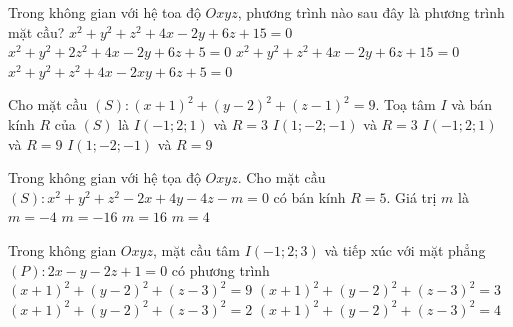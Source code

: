 \begin{ex}%
	Trong không gian với hệ toa độ $Oxyz$, phương trình nào sau đây là phương trình mặt cầu?
	\choice
	{$x^{2}+y^{2}+z^{2}+4 x-2 y+6 z+15=0$}
	{$x^{2}+y^{2}+2 z^{2}+4 x-2 y+6 z+5=0$}
	{\True $x^{2}+y^{2}+z^{2}+4 x-2 y+6 z+15=0$}
	{$x^{2}+y^{2}+z^{2}+4 x-2 x y+6 z+5=0$}
\end{ex}
\begin{ex}%
	Cho mặt cầu $(S)\colon (x+1)^2+(y-2)^2+(z-1)^2=9$. 
	Toạ tâm $I$ và bán kính $R$ của $(S)$ là
	\choice
	{\True $I(-1 ; 2 ; 1)$ và $R=3$}
	{$I(1 ;-2 ;-1)$ và $R=3$}
	{$I(-1 ; 2 ; 1)$ và $R=9$}
	{$I(1 ;-2 ;-1)$ và $R=9$}
\end{ex}
\begin{ex}%
	Trong không gian với hệ tọa độ $Oxyz$. Cho mặt cầu
	$(S)\colon x^{2}+y^{2}+z^{2}-2x+4y-4z-m=0$ có bán kính $R=5$. Giá trị $m$ là
	\choice
	{$m=-4$}
	{$m=-16$}
	{\True $m=16$}
	{$m=4$}
\end{ex}
\begin{ex}%
	Trong không gian $ Oxyz $, mặt cầu  tâm $I(-1 ; 2 ; 3)$ và tiếp xúc với mặt phẳng $(P)\colon 2x-y-2z+1=0$ có phương trình
	\choice
	{\True $(x+1)^{2}+(y-2)^{2}+(z-3)^{2}=9$}
	{$(x+1)^{2}+(y-2)^{2}+(z-3)^{2}=3$}
	{$(x+1)^{2}+(y-2)^{2}+(z-3)^{2}=2$}
	{$(x+1)^{2}+(y-2)^{2}+(z-3)^{2}=4$}
	
\end{ex}
